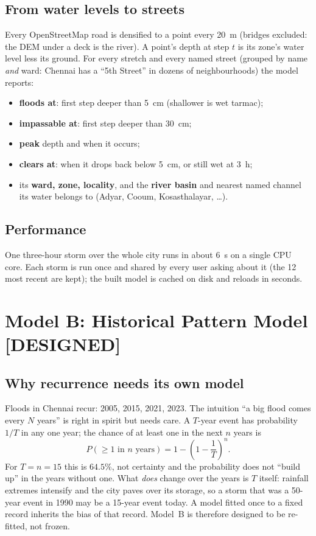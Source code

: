 \documentclass[11pt,a4paper]{article}
\newcommand{\planned}{\textcolor{planned}{\small\textbf{[DESIGNED]}}}
\begin{document}
\subsection{From water levels to streets}
Every OpenStreetMap road is densified to a point every 20~m (bridges excluded: the DEM
under a deck is the river). A point's depth at step $t$ is its zone's water level less
its ground. For every stretch and every named street (grouped by name \emph{and} ward:
Chennai has a ``5th Street'' in dozens of neighbourhoods) the model reports:
\begin{itemize}
  \item \textbf{floods at}: first step deeper than 5~cm (shallower is wet tarmac);
  \item \textbf{impassable at}: first step deeper than 30~cm;
  \item \textbf{peak} depth and when it occurs;
  \item \textbf{clears at}: when it drops back below 5~cm, or still wet at 3~h;
  \item its \textbf{ward, zone, locality}, and the \textbf{river basin} and nearest named
        channel its water belongs to (Adyar, Cooum, Kosasthalayar, \dots).
\end{itemize}

\subsection{Performance}
One three-hour storm over the whole city runs in about 6~s on a single CPU
core. Each storm is run once and shared by every user asking about it (the 12 most
recent are kept); the built model is cached on disk and reloads in seconds.

\section{Model B: Historical Pattern Model \planned}
\label{sec:modelB}

\subsection{Why recurrence needs its own model}
Floods in Chennai recur: 2005, 2015, 2021, 2023. The intuition ``a big flood comes
every $N$ years'' is right in spirit but needs care. A $T$-year event has probability
$1/T$ in any one year; the chance of at least one in the next $n$ years is
\begin{equation}
  P(\geq 1 \text{ in } n \text{ years}) = 1 - \left(1-\frac{1}{T}\right)^{n}.
\end{equation}
For $T = n = 15$ this is $64.5\%$, not certainty \textendash{} and the probability does
not ``build up'' in the years without one. What \emph{does} change over the years is
$T$ itself: rainfall extremes intensify and the city paves over its storage, so a
storm that was a 50-year event in 1990 may be a 15-year event today. A model fitted
once to a fixed record inherits the bias of that record. Model~B is therefore designed
to be re-fitted, not frozen.
\end{document}

